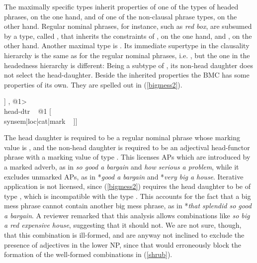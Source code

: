\documentclass[output=paper]{langsci/langscibook}
\begin{document}
The maximally specific types inherit properties of one of the types of headed phrases,
on the one hand, and of one of the non-clausal phrase types, on the other hand.  
Regular nominal phrases, for instance, such as \emph{red box}, are subsumed 
by a type, called , that inherits the 
constraints of , on the one hand, and 
, on the other hand.  
Another maximal type is . 
Its immediate supertype in the {\sc clausality} hierarchy is the same 
as for the regular nominal phrases, i.e. , 
but the one in the {\sc headedness} hierarchy is different: 
Being a subtype of , 
its non-head daughter does not select the head-daughter. 
Beside the inherited properties the BMC has some properties of its own.   
They are spelled out in (\ref{bigmess2}).

\begin{exe}
\ex\label{bigmess2} 
\begin{avm}
[\type{big-mess-phr}                                    \\     
 dtrs ~ <[\type{hd-functor-phr}                         \\
          synsem|loc|cat [head ~ \type{adjective}       \\
                          mark ~ \type{marked} ]] , @1> \\
 head-dtr ~ @1 [              \\
                synsem|loc|cat|mark ~ ]]
\end{avm}
\end{exe}

\noindent
The head daughter is required to be a regular nominal phrase 
whose {\sc marking} value is , and the non-head daughter 
is required to be an adjectival head-functor phrase
with a {\sc marking} value of type . 
This licenses APs which are introduced by a marked adverb, 
as in \emph{so good a bargain} and \emph{how serious a problem}, 
while it excludes unmarked APs, as in 
*\emph{good a bargain} and *\emph{very big a house}.
Iterative application is not licensed, since (\ref{bigmess2}) requires the 
head daughter to be of type , which is incompatible with the type 
. This accounts for the fact that a big
mess phrase cannot contain another big mess phrase, as in
*\emph{that splendid so good a bargain}.
A reviewer remarked that this analysis allows combinations like 
\emph{so big a red expensive house}, suggesting that it should not. 
We are not sure, though, that this combination is ill-formed, 
and are anyway not inclined to exclude the presence of adjectives in 
the lower NP, since that would erroneously block the formation of the 
well-formed combinations in (\ref{shrub}).
\end{document}
